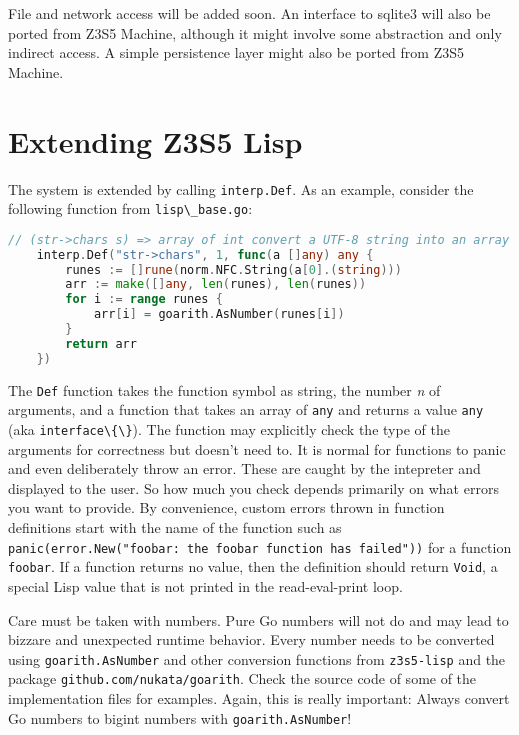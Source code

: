 \documentclass[
]{article}
\newcommand{\passthrough}[1]{#1}
\begin{document}
File and network access will be added soon. An interface to sqlite3 will
also be ported from Z3S5 Machine, although it might involve some
abstraction and only indirect access. A simple persistence layer might
also be ported from Z3S5 Machine.

\hypertarget{extending-z3s5-lisp}{%
\section{Extending Z3S5 Lisp}\label{extending-z3s5-lisp}}

The system is extended by calling \passthrough{\lstinline!interp.Def!}.
As an example, consider the following function from
\passthrough{\lstinline!lisp\_base.go!}:

\begin{lstlisting}[language=Go]
    // (str->chars s) => array of int convert a UTF-8 string into an array of runes
    interp.Def("str->chars", 1, func(a []any) any {
        runes := []rune(norm.NFC.String(a[0].(string)))
        arr := make([]any, len(runes), len(runes))
        for i := range runes {
            arr[i] = goarith.AsNumber(runes[i])
        }
        return arr
    })
\end{lstlisting}

The \passthrough{\lstinline!Def!} function takes the function symbol as
string, the number \emph{n} of arguments, and a function that takes an
array of \passthrough{\lstinline!any!} and returns a value
\passthrough{\lstinline!any!} (aka
\passthrough{\lstinline!interface\{\}!}). The function may explicitly
check the type of the arguments for correctness but doesn't need to. It
is normal for functions to panic and even deliberately throw an error.
These are caught by the intepreter and displayed to the user. So how
much you check depends primarily on what errors you want to provide. By
convenience, custom errors thrown in function definitions start with the
name of the function such as
\passthrough{\lstinline!panic(error.New("foobar: the foobar function has failed"))!}
for a function \passthrough{\lstinline!foobar!}. If a function returns
no value, then the definition should return
\passthrough{\lstinline!Void!}, a special Lisp value that is not printed
in the read-eval-print loop.

Care must be taken with numbers. Pure Go numbers will not do and may
lead to bizzare and unexpected runtime behavior. Every number needs to
be converted using \passthrough{\lstinline!goarith.AsNumber!} and other
conversion functions from \passthrough{\lstinline!z3s5-lisp!} and the
package \passthrough{\lstinline!github.com/nukata/goarith!}. Check the
source code of some of the implementation files for examples. Again,
this is really important: Always convert Go numbers to bigint numbers
with \passthrough{\lstinline!goarith.AsNumber!}!
\end{document}
